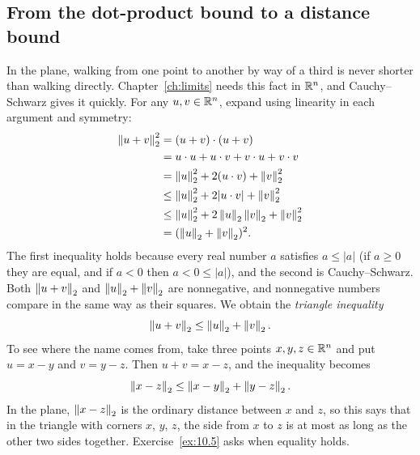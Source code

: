 \subsection*{From the dot-product bound to a distance bound}
In the plane, walking from one point to another by way of a third is never shorter than walking directly. Chapter~\ref{ch:limits} needs this fact in $\mathbb R^n$, and Cauchy--Schwarz gives it quickly. For any $u,v\in\mathbb R^n$, expand using linearity in each argument and symmetry:
\begin{align*}
 \left\|u+v\right\|_2^2
 &=(u+v)\cdot(u+v)\\
 &=u\cdot u+u\cdot v+v\cdot u+v\cdot v\\
 &=\left\|u\right\|_2^2+2(u\cdot v)+\left\|v\right\|_2^2\\
 &\le\left\|u\right\|_2^2+2|u\cdot v|+\left\|v\right\|_2^2\\
 &\le\left\|u\right\|_2^2+2\left\|u\right\|_2\left\|v\right\|_2+\left\|v\right\|_2^2\\
 &=(\left\|u\right\|_2+\left\|v\right\|_2)^2.
\end{align*}
The first inequality holds because every real number $a$ satisfies $a\le|a|$ (if $a\ge0$ they are equal, and if $a<0$ then $a<0\le|a|$), and the second is Cauchy--Schwarz. Both $\left\|u+v\right\|_2$ and $\left\|u\right\|_2+\left\|v\right\|_2$ are nonnegative, and nonnegative numbers compare in the same way as their squares. We obtain the \emph{triangle inequality}
\[
 \left\|u+v\right\|_2\le\left\|u\right\|_2+\left\|v\right\|_2.
\]
To see where the name comes from, take three points $x,y,z\in\mathbb R^n$ and put $u=x-y$ and $v=y-z$. Then $u+v=x-z$, and the inequality becomes
\[
\left\|x-z\right\|_2\le\left\|x-y\right\|_2+\left\|y-z\right\|_2.
\]
In the plane, $\left\|x-z\right\|_2$ is the ordinary distance between $x$ and $z$, so this says that in the triangle with corners $x$, $y$, $z$, the side from $x$ to $z$ is at most as long as the other two sides together. Exercise~\ref{ex:10.5} asks when equality holds.
